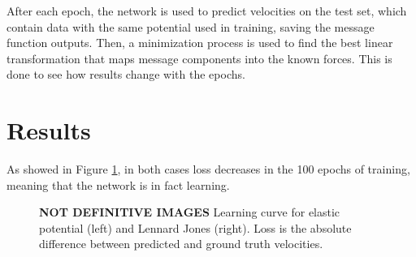 \documentclass[../../master_thesis_np.tex]{subfiles}
\begin{document}
After each epoch, the network is used to predict velocities on the test set, which contain data with the same potential used in training, saving the message function outputs.
Then, a minimization process is used to find the best linear transformation that maps message components into the known forces.
This is done to see how results change with the epochs.

\section{Results} \label{4results}
As showed in Figure \ref{fig:learning_curve}, in both cases loss decreases in the 100 epochs of training, meaning that the network is in fact learning.

\begin{figure}[b]
	\centering
	\caption{\textbf{NOT DEFINITIVE IMAGES} Learning curve for elastic potential (left) and Lennard Jones (right). Loss is the absolute difference between predicted and ground truth velocities.}
	\label{fig:learning_curve}
\end{figure}
\end{document}
